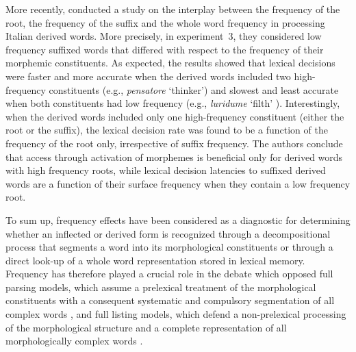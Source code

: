 \documentclass[output=paper]{langsci/langscibook}
\begin{document}
More recently, %
\citet{BuraniThornton2003} %
%
conducted a study on the
interplay between the frequency of the root, the frequency of the suffix
and the whole word frequency in processing Italian derived words. More
precisely, in experiment~3, they considered low frequency suffixed words that
differed with respect to the frequency of their morphemic constituents.
As expected, the results showed that lexical decisions were faster and
more accurate when the derived words included two high-frequency
constituents (e.g., \emph{pensatore} `thinker') and slowest and least
accurate when both constituents had low frequency (e.g., \emph{luridume}
`filth' ). Interestingly, when the derived words included only one
high-frequency constituent (either the root or the suffix), the lexical
decision rate was found to be a function of the frequency of the root
only, irrespective of suffix frequency. The authors conclude that access
through activation of morphemes is beneficial only for derived words
with high frequency roots, while lexical decision latencies to suffixed
derived words are a function of their surface frequency when they
contain a low frequency root.

To sum up, frequency effects have been considered as a diagnostic for
determining whether an inflected or derived form is recognized through a
decompositional process that segments a word into its morphological
constituents or through a direct look-up of a whole word representation
stored in lexical memory. Frequency has therefore played a crucial role
in the debate which opposed full parsing models, which assume a
prelexical treatment of the morphological constituents with a consequent
systematic and compulsory segmentation of all complex words %
\citep{TaftForster1975,Taft1979}%
%
, and full listing models, which defend a
non-prelexical processing of the morphological structure and a complete
representation of all morphologically complex words %
\citep[see][]{McClellandRumelhart1981}%
%
.
\end{document}
